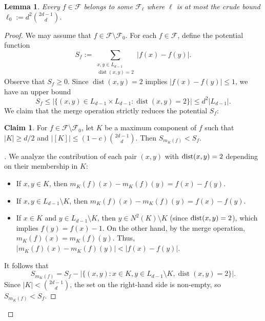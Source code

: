 \documentclass{amsart}
\newenvironment{subproof}[1][\proofname]{
  \renewcommand{\qedsymbol}{$\blacksquare$}
  \begin{proof}[#1]
}{
  \end{proof}
}
\newtheorem{lem}[thm]{Lemma}
\theoremstyle{definition}
\newtheorem{claim}[thm]{Claim}
\newcommand{\cF}{\mathcal{F} }
\newcommand{\0}[0]{\emptyset}
\newcommand{\dist}[0]{\mbox{\rm{dist}}}
\begin{document}
\begin{lem}\label{lem:ell_0} 
Every $f\in\cF$ belongs to some $\cF_\ell$ where $\ell$ is at most the crude bound $\ell_0:=d^2{2d-1 \choose d}$.
\end{lem}

\begin{proof} 
We may assume that $f \in \cF \setminus \cF_0$. For each $f\in\cF$, define the potential function
$$S_f := \sum_{\substack{x,y \in L_{d-1} \\ \operatorname{dist}(x,y)=2}} |f(x)-f(y)|.$$
Observe that $S_f \geq 0$. Since $\operatorname{dist}(x,y)=2$ implies $|f(x)-f(y)| \leq 1$, we have an upper bound 
$$S_f \leq |\{(x,y) \in L_{d-1} \times L_{d-1} : \operatorname{dist}(x,y)=2\}| \leq d^2 |L_{d-1}|.$$
We claim that the merge operation strictly reduces the potential $S_f$:

\begin{claim}
    For $f \in \mathcal{F} \setminus \mathcal{F}_0$, let $K$ be a maximum component of $f$ such that $|K| \geq d/2$ and $|[K]| \leq (1-c)\binom{2d-1}{d}$. Then $S_{m_K(f)} < S_f$.
\end{claim}

\begin{subproof}
We analyze the contribution of each pair $(x,y)$ with $\dist(x,y)=2$ depending on their membership in $K$:
\begin{itemize}
    \item If $x,y \in K$, then $m_K(f)(x) - m_K(f)(y) = f(x) - f(y)$.
    \item If $x,y \in L_{d-1} \setminus K$, then $m_K(f)(x) - m_K(f)(y) = f(x) - f(y)$.
    \item If $x \in K$ and $y \in L_{d-1} \setminus K$, then $y \in N^2(K) \setminus K$ (since $\dist(x,y)=2$), which implies $f(y) = f(x) - 1$. On the other hand, by the merge operation, $m_K(f)(x) = m_K(f)(y)$. Thus, $|m_K(f)(x) - m_K(f)(y)|  <  |f(x) - f(y)|$.
\end{itemize}
It follows that
$$S_{m_K(f)} = S_f - |\{(x,y) : x \in K, y \in L_{d-1} \setminus K, \operatorname{dist}(x,y)=2\}|.$$
Since $|K| < \binom{2d-1}{d}$, the set on the right-hand side is non-empty, so $S_{m_K(f)} < S_f$. 
\end{subproof}


\end{proof}
\end{document}
